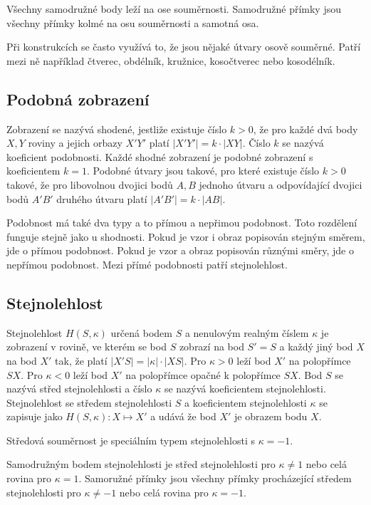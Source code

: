 \documentclass[12pt]{article}
\begin{document}
Všechny samodružné body leží na ose souměrnosti. Samodružné přímky jsou všechny přímky kolmé na osu
souměrnosti a samotná osa.

Při konstrukcích se často využívá to, že jsou nějaké útvary osově souměrné. Patří mezi ně
například čtverec, obdélník, kružnice, kosočtverec nebo kosodélník.

\subsection*{Podobná zobrazení}
Zobrazení se nazývá shodené, jestliže existuje číslo $k > 0$, že pro každé dvá body $X, Y$ roviny a
jejich orbazy $X'Y'$ platí $|X'Y'| = k \cdot |XY|$. Číslo $k$ se nazývá koeficient podobnosti. Každé
shodné zobrazení je podobné zobrazení s koeficientem $k = 1$. Podobné útvary jsou takové, pro které
existuje číslo $k > 0$ takové, že pro libovolnou dvojici bodů $A, B$ jednoho útvaru a odpovídající
dvojici bodů $A'B'$ druhého útvaru platí $|A'B'| = k \cdot |AB|$.

Podobnost má také dva typy a to přímou a nepřimou podobnost. Toto rozdělení funguje stejně jako
u shodnosti. Pokud je vzor i obraz popisován stejným směrem, jde o přímou podobnost. Pokud je vzor
a obraz popisován různými směry, jde o nepřímou podobnost. Mezi přímé podobnosti patří stejnolehlost.

\subsection*{Stejnolehlost}
Stejnolehlost $H(S, \kappa)$ určená bodem $S$ a nenulovým realným číslem $\kappa$ je zobrazení v
rovině, ve kterém se bod $S$ zobrazí na bod $S' = S$ a každý jiný bod $X$ na bod $X'$ tak, že platí
$|X'S| = |\kappa| \cdot |XS|$. Pro $\kappa > 0$ leží bod $X'$ na polopřímce $SX$. Pro $\kappa < 0$
leží bod $X'$ na polopřímce opačné k polopřímce $SX$. Bod $S$ se nazývá střed stejnolehlosti a číslo
$\kappa$ se  nazývá koeficientem stejnolehlosti. Stejnolehlost se středem stejnolehlosti $S$ a
koeficientem stejnolehlosti $\kappa$ se zapisuje jako $H(S, \kappa) : X \mapsto X'$ a udává že bod
$X'$ je obrazem bodu $X$.

Středová souměrnost je speciálním typem stejnolehlosti s $\kappa = -1$.

Samodružným bodem stejnolehlosti je střed stejnolehlosti pro $\kappa \ne 1$ nebo celá rovina
pro $\kappa = 1$. Samoružné přímky jsou všechny přímky procházející středem stejnolehlosti pro
$\kappa \ne -1$ nebo celá rovina pro $\kappa = -1$.
\end{document}
